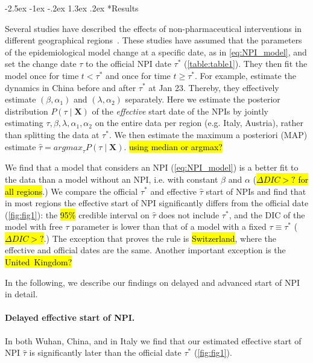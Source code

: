 \documentclass[12pt]{extarticle}
\makeatletter
\renewcommand\section{\@startsection {section}{1}{\z@}%
     {-2.5ex \@plus -1ex \@minus -.2ex}%
     {1.3ex \@plus.2ex}%
    {\Large\bfseries}}
\let\vec\mathbf
\makeatother
\begin{document}
\section*{Results}

Several studies have described the effects of non-pharmaceutical interventions in different geographical regions~\citep{Flaxman2020,Gatto2020,Li2020}. 
These studies have assumed that the parameters of the epidemiological model change at a specific date, as in \autoref{eq:NPI_model}, and set the change date $\tau$ to the official NPI date $\tau^*$ (\autoref{table:table1}).
They then fit the model once for time $t<\tau^*$ and once for time $t \ge \tau^*$.
For example, \citet{Li2020} estimate the dynamics in China before and after $\tau^*$ at Jan 23. Thereby, they effectively estimate $(\beta, \alpha_1)$ and $(\lambda, \alpha_2)$ separately.
Here we estimate the posterior distribution $P(\tau \mid \vec{X})$ of the \emph{effective} start date of the NPIs by jointly estimating $\tau, \beta, \lambda, \alpha_1, \alpha_2$ on the entire data per region (e.g. Italy, Austria), rather than splitting the data at $\tau^*$.
We then estimate the maximum a posteriori (MAP) estimate $\hat{\tau}=\mathit{argmax}_{\tau}{P(\tau \mid \vec{X})}$. \hl{using median or argmax?}

We find that a model that considers an NPI (\autoref{eq:NPI_model}) is a better fit to the data than a model without an NPI, i.e. with constant $\beta$ and $\alpha$ (\hl{$\Delta DIC > ?$ for all regions}.)
We compare the official $\tau^*$ and effective $\hat{\tau}$ start of NPIs and find that in most regions the effective start of NPI  significantly differs from the official date (\autoref{fig:fig1}): the \hl{95\%} credible interval on $\hat{\tau}$ does not include $\tau^*$, and the DIC of the model with free $\tau$ parameter is lower than that of a model with a fixed $\tau \equiv \tau^*$ (\hl{$\Delta DIC > ?$}.) The exception that proves the rule is \hl{Switzerland}, where the effective and official dates are the same. Another important exception is the \hl{United~Kingdom?} %

In the following, we describe our findings on delayed and advanced start of NPI in detail.



\paragraph*{Delayed effective start of NPI.}
In both Wuhan, China, and in Italy we find that our estimated effective start of NPI $\hat{\tau}$ is significantly later than the official date $\tau^*$ (\autoref{fig:fig1}). 
\end{document}
